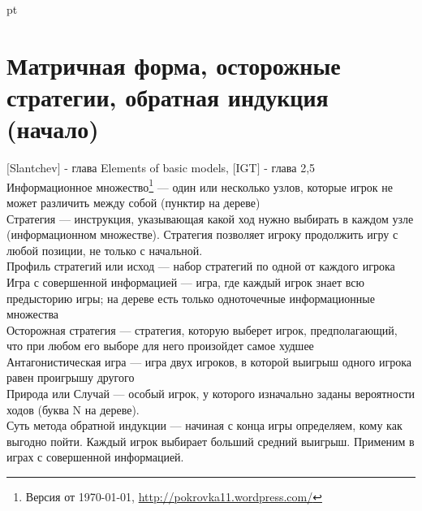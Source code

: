 \documentclass[pdftex,12pt,a4paper]{article}
\begin{document}
 pt %









\section{Матричная форма, осторожные стратегии, обратная индукция (начало)}

$[$Slantchev$]$ - глава Elements of basic models, $[$IGT$]$ - глава 2,5 \\

\small
Информационное множество\footnote{Версия от \today, \url{http://pokrovka11.wordpress.com/} } --- один или несколько узлов, которые игрок не может различить между собой (пунктир на дереве) \\
Стратегия --- инструкция, указывающая какой ход нужно выбирать в каждом узле (информационном множестве). Стратегия позволяет игроку продолжить игру с любой позиции, не только с начальной. \\
Профиль стратегий или исход --- набор стратегий по одной от каждого игрока \\
Игра с совершенной информацией --- игра, где каждый игрок знает всю предысторию игры;  на дереве есть только одноточечные информационные множества\\
Осторожная стратегия --- стратегия, которую выберет игрок, предполагающий, что при любом его выборе для него произойдет самое худшее\\
Антагонистическая игра --- игра двух игроков, в которой выигрыш одного игрока равен проигрышу другого\\
Природа или Случай --- особый игрок, у которого изначально заданы вероятности ходов (буква N на дереве).\\
Суть метода обратной индукции --- начиная с конца игры определяем, кому как выгодно пойти. Каждый игрок выбирает больший средний выигрыш. Применим в играх с совершенной информацией. \\
\normalsize
\end{document}
